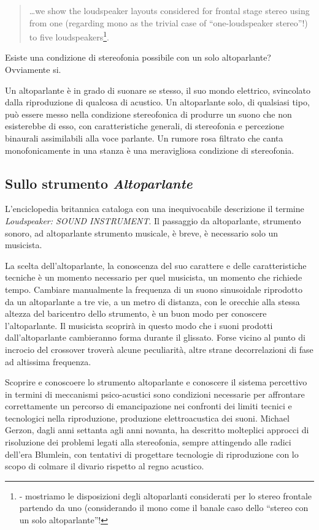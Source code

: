 \begin{quotation}
\ldots we show the loudspeaker layouts considered for frontal stage stereo
using from one (regarding mono as the trivial case of “one-loudspeaker stereo”!)
to five loudspeakers\footnote{\cite{mg92pdmsss} - mostriamo le disposizioni
degli altoparlanti considerati per lo stereo frontale partendo da uno
(considerando il mono come il banale caso dello “stereo con un solo altoparlante”!}.
\end{quotation}

Esiste una condizione di stereofonia possibile con un solo altoparlante? Ovviamente si.

Un altoparlante è in grado di suonare se stesso, il suo mondo elettrico, svincolato
dalla riproduzione di qualcosa di acustico. Un altoparlante solo, di qualsiasi tipo,
può essere messo nella condizione stereofonica di produrre un suono che non esisterebbe di esso,
con caratteristiche generali, di stereofonia e percezione binaurali assimilabili alla voce parlante.
Un rumore rosa filtrato che canta monofonicamente in una stanza è una meravigliosa condizione di stereofonia.

\subsection{Sullo strumento \emph{Altoparlante}}

L'enciclopedia britannica cataloga con una inequivocabile descrizione il termine
\emph{Loudspeaker: SOUND INSTRUMENT}. Il passaggio da altoparlante, strumento
sonoro, ad altoparlante strumento musicale, è breve, è necessario solo un musicista.

La scelta dell'altoparlante, la conoscenza del suo carattere e delle caratteristiche
tecniche è un momento necessario per quel musicista, un momento che richiede tempo.
Cambiare manualmente la frequenza di un suono sinusoidale riprodotto da un
altoparlante a tre vie, a un metro di distanza, con le orecchie alla stessa
altezza del baricentro dello strumento, è un buon modo per conoscere l'altoparlante. Il musicista scoprirà in questo modo che i
suoni prodotti dall'altoparlante cambieranno forma durante il glissato. Forse
vicino al punto di incrocio del crossover troverà alcune peculiarità, altre
strane decorrelazioni di fase ad altissima frequenza.

Scoprire e conoscoere lo strumento altoparlante e conoscere il sistema percettivo
in termini di meccanismi psico-acustici sono condizioni necessarie per
affrontare correttamente un percorso di emancipazione nei confronti dei limiti
tecnici e tecnologici nella riproduzione, produzione elettroacustica dei suoni.
Michael Gerzon, dagli anni settanta agli anni novanta, ha descritto molteplici
approcci di risoluzione dei problemi legati alla stereofonia, sempre attingendo
alle radici dell'era Blumlein, con tentativi di progettare tecnologie di
riproduzione con lo scopo di colmare il divario rispetto al regno acustico.

